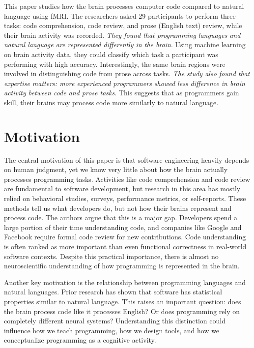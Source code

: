 This paper studies how the brain processes computer code compared to natural language using fMRI. The researchers asked 29 participants to perform three tasks: code comprehension, code review, and prose (English text) review, while their brain activity was recorded.
\textit{They found that programming languages and natural language are represented differently in the brain}. Using machine learning on brain activity data, they could classify which task a participant was performing with high accuracy. Interestingly, the same brain regions were involved in distinguishing code from prose across tasks.
\textit{The study also found that expertise matters: more experienced programmers showed less difference in brain activity between code and prose tasks}. This suggests that as programmers gain skill, their brains may process code more similarly to natural language.

\section{Motivation}
The central motivation of this paper is that software engineering heavily depends on human judgment, yet we know very little about how the brain actually processes programming tasks. Activities like code comprehension and code review are fundamental to software development, but research in this area has mostly relied on behavioral studies, surveys, performance metrics, or self-reports. These methods tell us what developers do, but not how their brains represent and process code.
The authors argue that this is a major gap. Developers spend a large portion of their time understanding code, and companies like Google and Facebook require formal code review for new contributions. Code understanding is often ranked as more important than even functional correctness in real-world software contexts. Despite this practical importance, there is almost no neuroscientific understanding of how programming is represented in the brain.

Another key motivation is the relationship between programming languages and natural languages. Prior research has shown that software has statistical properties similar to natural language. This raises an important question: does the brain process code like it processes English? Or does programming rely on completely different neural systems? Understanding this distinction could influence how we teach programming, how we design tools, and how we conceptualize programming as a cognitive activity.

